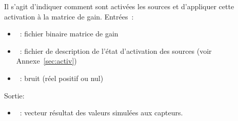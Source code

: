 Il s'agit d'indiquer comment sont activées les sources et d'appliquer cette activation à la matrice de gain. 
Entrées~: 
\begin{itemize}
    \item {}~: fichier binaire matrice de gain
    \item {}~: fichier de description de l'état d'activation des sources (voir Annexe~\ref{sec:activ})
    \item {}~: bruit (réel positif ou nul)
\end{itemize}
Sortie:
\begin{itemize}
    \item {}~: vecteur résultat des valeurs simulées aux capteurs.
\end{itemize}

\medskip

\noindent
{}
